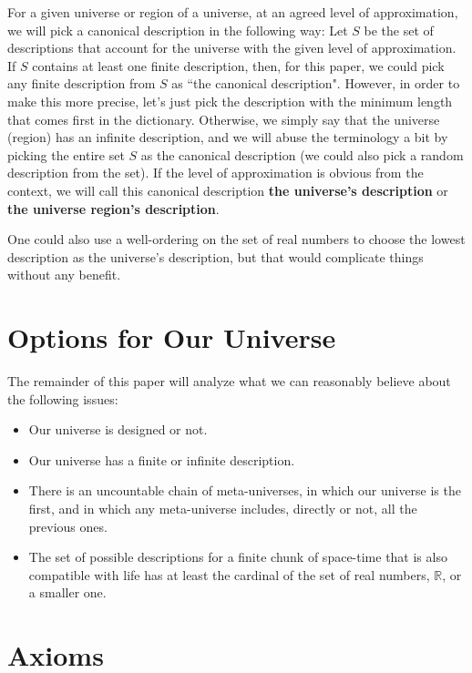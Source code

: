 \documentclass[a4paper
,draft
]{article}
\def\reale{\mathbb{R}}
\newcommand{\definitie}[1]{\textbf{#1}}
\newcommand{\ghilimele}[1]{``#1"}
\begin{document}
For a given universe or region of a universe,
at an agreed level of approximation, we will pick a canonical description
in the following way: Let $S$ be the set of descriptions that account for
the universe with the given level of approximation. If $S$ contains
at least one finite description, then, for this paper,
we could pick any finite description from $S$ as
\ghilimele{the canonical description}.
However, in order to make this more precise,
let's just pick the description with the minimum length
that comes first in the dictionary.
Otherwise, we simply say that the
universe (region) has an infinite description, and we will abuse the
terminology a bit by picking the entire set
$S$ as the canonical description (we could
also pick a random description from the set).
If the level of approximation is obvious from the context, we will call
this canonical description \definitie{the universe's description}
or \definitie{the universe region's description}.

One could also use a well-ordering on the set of real numbers to choose the
lowest description as the universe's description, but that would
complicate things without any benefit.

\section{Options for Our Universe}
\label{sec:options}

The remainder of this paper will analyze what we can reasonably believe about
the following issues:
\begin{itemize}
  \item Our universe is designed or not.
  \item Our universe has a finite or infinite description.
  \item There is an uncountable chain of meta-universes, in which
        our universe is the first, and in which any meta-universe
        includes, directly or not, all the previous ones.
  \item The set of possible descriptions for a finite chunk of space-time
        that is also compatible with life has at least the cardinal
        of the set of real numbers, $\reale$, or a smaller one.
\end{itemize}

\section{Axioms}
\label{sec:axioms}
\end{document}
